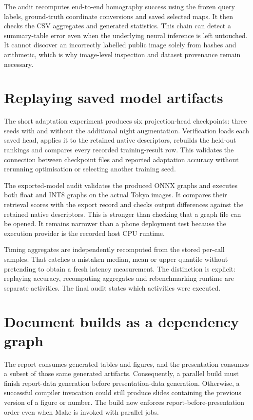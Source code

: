 The audit recomputes end-to-end homography success using the frozen query labels, ground-truth coordinate conversions and saved selected maps. It then checks the CSV aggregates and generated statistics. This chain can detect a summary-table error even when the underlying neural inference is left untouched. It cannot discover an incorrectly labelled public image solely from hashes and arithmetic, which is why image-level inspection and dataset provenance remain necessary.

\section{Replaying saved model artifacts}
The short adaptation experiment produces six projection-head checkpoints: three seeds with and without the additional night augmentation. Verification loads each saved head, applies it to the retained native descriptors, rebuilds the held-out rankings and compares every recorded training-result row. This validates the connection between checkpoint files and reported adaptation accuracy without rerunning optimisation or selecting another training seed.

The exported-model audit validates the produced ONNX graphs and executes both float and INT8 graphs on the actual Tokyo images. It compares their retrieval scores with the export record and checks output differences against the retained native descriptors. This is stronger than checking that a graph file can be opened. It remains narrower than a phone deployment test because the execution provider is the recorded host CPU runtime.

Timing aggregates are independently recomputed from the stored per-call samples. That catches a mistaken median, mean or upper quantile without pretending to obtain a fresh latency measurement. The distinction is explicit: replaying accuracy, recomputing aggregates and rebenchmarking runtime are separate activities. The final audit states which activities were executed.

\section{Document builds as a dependency graph}
The report consumes generated tables and figures, and the presentation consumes a subset of those same generated artifacts. Consequently, a parallel build must finish report-data generation before presentation-data generation. Otherwise, a successful compiler invocation could still produce slides containing the previous version of a figure or number. The build now enforces report-before-presentation order even when Make is invoked with parallel jobs.

